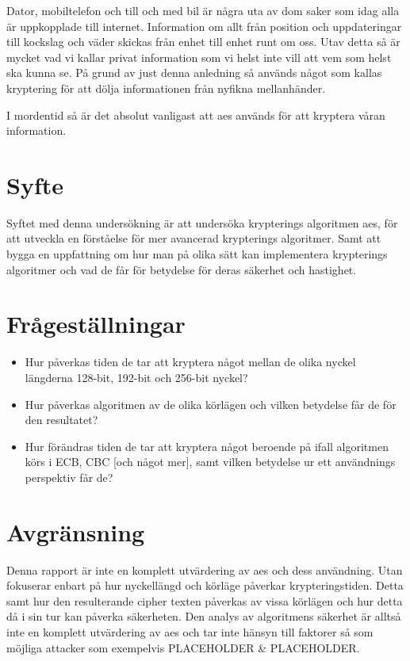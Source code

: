 
Dator, mobiltelefon och till och med bil är några uta av dom saker som idag alla är uppkopplade
till internet. Information om allt från position och uppdateringar till kockslag och väder skickas
från enhet till enhet runt om oss. Utav detta så är mycket vad vi kallar privat information som
vi helst inte vill att vem som helst ska kunna se. På grund av just denna anledning så används
något som kallas kryptering för att dölja informationen från nyfikna mellanhänder.

I mordentid så är det absolut vanligast att \acrfull{aes} används för att kryptera våran information.


\section{Syfte} %
Syftet med denna undersökning är att undersöka krypterings algoritmen \acrshort{aes},
för att utveckla en förståelse för mer avancerad krypterings algoritmer.
Samt att bygga en uppfattning om hur man på olika sätt kan implementera
krypterings algoritmer och vad de får för betydelse för deras säkerhet och
hastighet.

\section{Frågeställningar} %
\begin{itemize}
    \setlength{\itemindent}{-1em}
    \item Hur påverkas tiden de tar att kryptera något mellan de olika nyckel längderna 128-bit,
          192-bit och 256-bit nyckel?

    \item Hur påverkas algoritmen av de olika körlägen och vilken betydelse får de för den resultatet?

    \item Hur förändras tiden de tar att kryptera något beroende på ifall algoritmen körs i ECB, CBC
          [och något mer], samt vilken betydelse ur ett användnings perspektiv får de?
\end{itemize}

\section{Avgränsning} %

Denna rapport är inte en komplett utvärdering av \acrshort{aes} och dess användning. Utan fokuserar
enbart på hur nyckellängd och körläge påverkar krypteringstiden. Detta samt hur den resulterande
cipher texten påverkas av vissa körlägen och hur detta då i sin tur kan påverka säkerheten. Den
analys av algoritmens säkerhet är alltså inte en komplett utvärdering av \acrshort{aes} och tar
inte hänsyn till faktorer så som möjliga attacker som exempelvis PLACEHOLDER \& PLACEHOLDER.